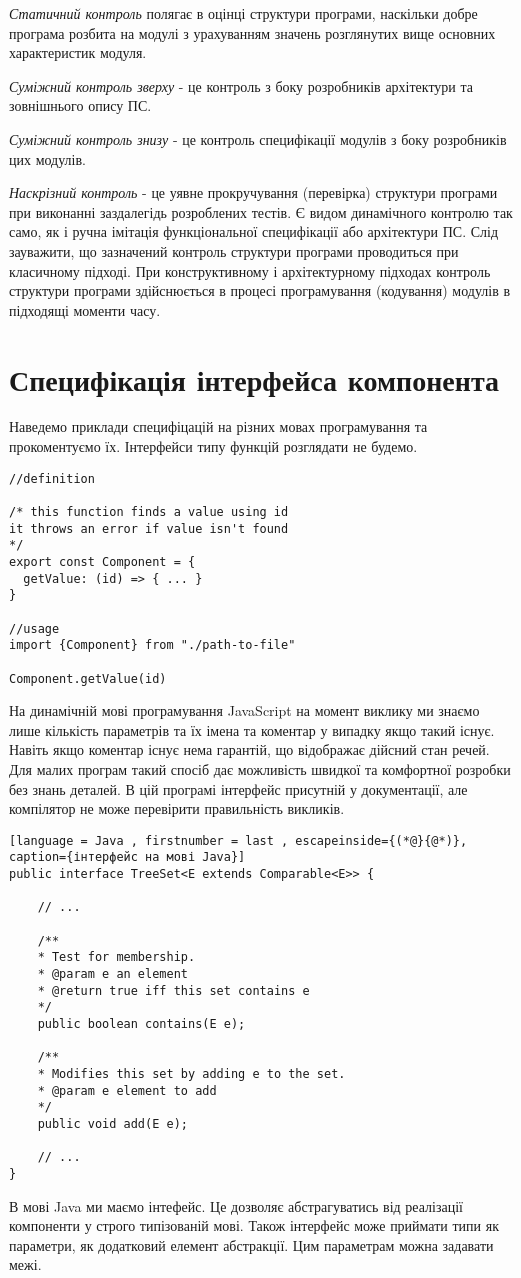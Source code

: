 \documentclass[a4paper,14pt, titlepage]{article}
\begin{document}
\emph{Статичний контроль} полягає в оцінці структури програми, наскільки
добре програма розбита на модулі з урахуванням значень розглянутих вище
основних характеристик модуля.

\emph{Суміжний контроль зверху} - це
контроль з боку розробників архітектури та зовнішнього опису ПС.

\emph{Суміжний контроль знизу} - це контроль специфікації модулів з боку
розробників цих модулів.

\emph{Наскрізний контроль} - це уявне
прокручування (перевірка) структури програми при виконанні заздалегідь
розроблених тестів. Є видом динамічного контролю так само, як і ручна
імітація функціональної специфікації або архітектури ПС. Слід зауважити,
що зазначений контроль структури програми проводиться при класичному
підході. При конструктивному і архітектурному підходах контроль
структури програми здійснюється в процесі програмування (кодування)
модулів в підходящі моменти часу.

\section{Специфікація інтерфейса компонента}
Наведемо приклади специфіцацій на різних мовах програмування та прокоментуємо їх.
Інтерфейси типу функцій розглядати не будемо.
\begin{lstlisting}[style=JavaScript, caption={Компонта на Javascript}]
//definition

/* this function finds a value using id
it throws an error if value isn't found
*/
export const Component = {
  getValue: (id) => { ... }
}

//usage
import {Component} from "./path-to-file"

Component.getValue(id)
\end{lstlisting}
На динамічній мові програмування JavaScript на момент виклику ми знаємо лише кількість параметрів та їх імена та коментар
у випадку якщо такий існує. Навіть якщо коментар існує нема гарантій, що відображає дійсний стан речей.
Для малих програм такий спосіб дає можливість швидкої та комфортної розробки без знань деталей.
В цій програмі інтерфейс присутній у документації, але компілятор не може перевірити правильність викликів.

\begin{lstlisting}[language = Java , firstnumber = last , escapeinside={(*@}{@*)}, caption={інтерфейс на мові Java}]
public interface TreeSet<E extends Comparable<E>> {

    // ...

    /**
    * Test for membership.
    * @param e an element
    * @return true iff this set contains e
    */
    public boolean contains(E e);

    /**
    * Modifies this set by adding e to the set.
    * @param e element to add
    */
    public void add(E e);

    // ...
}
\end{lstlisting}
В мові Java ми маємо інтефейс.
Це дозволяє абстрагуватись від реалізації компоненти у строго типізованій мові.
Також інтерфейс може приймати типи як параметри, як додатковий елемент абстракції.
Цим параметрам можна задавати межі.
\end{document}
